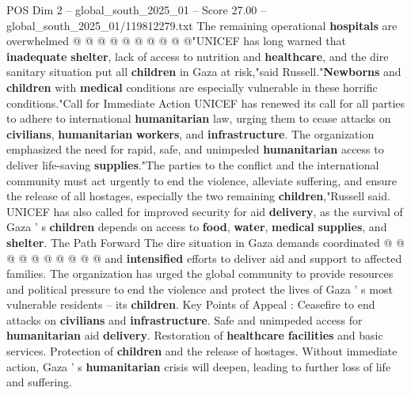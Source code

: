 \begin{textsample}{POS Dim 2 – global\_south\_2025\_01 – Score 27.00 – global\_south\_2025\_01/119812279.txt}
The remaining operational \textbf{hospitals} are overwhelmed @ @ @ @ @ @ @ @ @ @"UNICEF has long warned that \textbf{inadequate} \textbf{shelter}, lack of access to nutrition and \textbf{healthcare}, and the dire sanitary situation put all \textbf{children} in Gaza at risk,"said Russell."\textbf{Newborns} and \textbf{children} with \textbf{medical} conditions are especially vulnerable in these horrific conditions."Call for Immediate Action UNICEF has renewed its call for all parties to adhere to international \textbf{humanitarian} law, urging them to cease attacks on \textbf{civilians}, \textbf{humanitarian} \textbf{workers}, and \textbf{infrastructure}.
The organization emphasized the need for rapid, safe, and unimpeded \textbf{humanitarian} access to deliver life-saving \textbf{supplies}."The parties to the conflict and the international community must act urgently to end the violence, alleviate suffering, and ensure the release of all hostages, especially the two remaining \textbf{children},"Russell said.
UNICEF has also called for improved security for aid \textbf{delivery}, as the survival of Gaza ' s \textbf{children} depends on access to \textbf{food}, \textbf{water}, \textbf{medical} \textbf{supplies}, and \textbf{shelter}.
The Path Forward The dire situation in Gaza demands coordinated @ @ @ @ @ @ @ @ @ @ and \textbf{intensified} efforts to deliver aid and support to affected families.
The organization has urged the global community to provide resources and political pressure to end the violence and protect the lives of Gaza ' s most vulnerable residents -- its \textbf{children}.
Key Points of Appeal : Ceasefire to end attacks on \textbf{civilians} and \textbf{infrastructure}.
Safe and unimpeded access for \textbf{humanitarian} aid \textbf{delivery}.
Restoration of \textbf{healthcare} \textbf{facilities} and basic services.
Protection of \textbf{children} and the release of hostages.
Without immediate action, Gaza ' s \textbf{humanitarian} crisis will deepen, leading to further loss of life and suffering.

\end{textsample}
